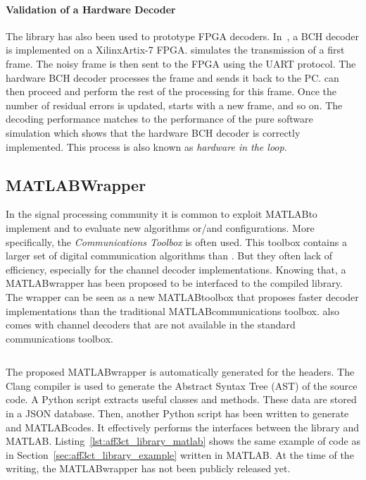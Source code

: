 \paragraph{Validation of a Hardware Decoder}

The \AFFECT library has also been used to prototype FPGA decoders.
In~\cite{Cassagne2017a}, a BCH decoder is implemented on a Xilinx\R Artix-7
FPGA. \AFFECT simulates the transmission of a first frame. The noisy frame is
then sent to the FPGA using the UART protocol. The hardware BCH decoder
processes the frame and sends it back to the PC. \AFFECT can then proceed and
perform the rest of the processing for this frame. Once the number of residual
errors is updated, \AFFECT starts with a new frame, and so on. The decoding
performance matches to the performance of the pure software simulation which
shows that the hardware BCH decoder is correctly implemented. This process is
also known as \emph{hardware in the loop}.

\subsection{MATLAB\R Wrapper}

In the signal processing community it is common to exploit MATLAB\R to implement
and to evaluate new algorithms or/and configurations. More specifically, the
\emph{Communications Toolbox} is often used. This toolbox contains a larger set
of digital communication algorithms than \AFFECT. But they often lack of
efficiency, especially for the channel decoder implementations. Knowing that, a
MATLAB\R wrapper has been proposed to be interfaced to the compiled \AFFECT
library. The wrapper can be seen as a new MATLAB\R toolbox that proposes faster
decoder implementations than the traditional MATLAB\R communications toolbox.
\AFFECT also comes with channel decoders that are not available in the standard
communications toolbox.

\begin{listing}[htp]
  \inputminted[frame=lines,linenos]{matlab}{\curChapter/src/use_cases/library/repetition_chain.m}
  \caption{Example of the \AFFECT MATLAB\R wrapper.}
  \label{lst:aff3ct_library_matlab}
\end{listing}

The proposed MATLAB\R wrapper is automatically generated for the \AFFECT
headers. The Clang compiler is used to generate the Abstract Syntax Tree (AST)
of the \AFFECT source code. A Python script extracts useful classes and methods.
These data are stored in a JSON database. Then, another Python script has been
written to generate \Cxx and MATLAB\R codes. It effectively performs the
interfaces between the \AFFECT library and MATLAB\R.
Listing~\ref{lst:aff3ct_library_matlab} shows the same example of code as in
Section~\ref{sec:aff3ct_library_example} written in MATLAB\R. At the time of the
writing, the MATLAB\R wrapper has not been publicly released yet.

